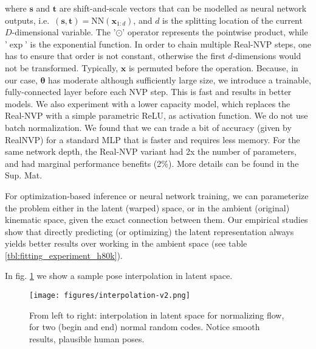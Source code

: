 \documentclass[runningheads]{llncs}
\newcommand{\thetab}{\bm{\theta}}
\newcommand{\tb}{\mathbf{t}}
\newcommand{\xx}{\mathbf{x}}
\newcommand{\ie}{i.e.\ }
\begin{document}
where $\mathbf{s}$ and $\tb$ are shift-and-scale vectors that can be modelled as neural network outputs,
\ie $(\mathbf{s}, \tb) = \text{NN}(\xx_{1:d})$, and $d$ is the splitting location of the current $D$-dimensional variable. The '$\odot$' operator represents the pointwise product, while '$\exp$' is the exponential function. In order to chain multiple Real-NVP steps, one has to ensure that order is not constant, otherwise the first $d$-dimensions would not be transformed. Typically, $\xx$ is permuted before the operation. Because, in our case, $\thetab$ has moderate although sufficiently large size, we introduce a trainable, fully-connected layer before each NVP step. This is fast and results in better models. We also experiment with a lower capacity model, which replaces the Real-NVP with a simple parametric ReLU, as activation function. We do not use batch normalization. We found that we can trade a bit of accuracy (given by RealNVP) for a standard MLP that is faster and requires less memory.  For the same network depth, the Real-NVP variant had 2x the number of parameters, and had marginal performance benefits (2\%). More details can be found in the Sup. Mat.

For optimization-based inference or neural network training, we can parameterize the problem either in the latent (warped) space, or in the ambient (original) kinematic space, given the exact connection between them. Our empirical studies show that directly predicting (or optimizing) the latent representation always yields better results over working in the ambient space (see table \ref{tbl:fitting_experiment_h80k}).

In fig. \ref{fig:interpolation} we show a sample pose interpolation in latent space.
\begin{figure}[!ht]
\begin{center}
    \texttt{[image: figures/interpolation-v2.png]}
\end{center}
\caption{\small From left to right: interpolation in latent space for normalizing flow, for two (begin and end) normal random codes. Notice smooth results, plausible human poses.}
\label{fig:interpolation}
\end{figure}
\end{document}

